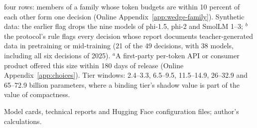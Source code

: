 \begin{table}[tp]
\begin{tablenotes}
four rows: members of a family whose token budgets are within 10 percent of each other form one decision (Online
Appendix~\ref{app:wedge-family}). Synthetic data: the earlier flag drops the nine models of phi-1.5, phi-2 and SmolLM 1--3;
$^b$the protocol's rule flags every decision whose report documents teacher-generated data in pretraining or mid-training
(21 of the 49 decisions, with 38 models, including all six decisions of 2025). $^a$A first-party per-token API or consumer
product offered this size within 180 days of release (Online Appendix~\ref{app:choices}). Tier windows: 2.4--3.3,
6.5--9.5, 11.5--14.9, 26--32.9 and 65--72.9 billion parameters, where a binding tier's shadow value is part of the value
of compactness.
\end{tablenotes}
\begin{tablenotes}[Source]
Model cards, technical reports and Hugging Face configuration files; author's calculations.
\end{tablenotes}
\end{table}
